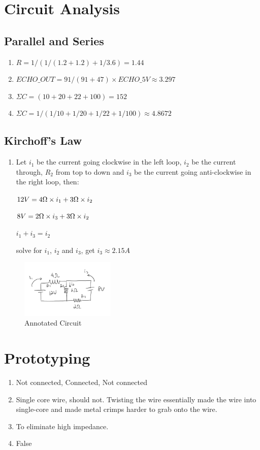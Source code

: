 \documentclass{article}
\begin{document}
\section{Circuit Analysis}
\subsection{Parallel and Series}
	\begin{enumerate}
		\item $R=1/(1/(1.2+1.2)+1/3.6)=1.44$
		\item $ECHO\_OUT=91/(91+47)\times ECHO\_5V\approx 3.297$
		\item $\Sigma C=(10+20+22+100)=152$
		\item $\Sigma C=1/(1/10+1/20+1/22+1/100)\approx 4.8672$
	\end{enumerate}
\subsection{Kirchoff's Law}
	\begin{enumerate}
		\item Let $i_1$ be the current going clockwise in the left loop, $i_2$ be the current through, $R_2$ from top to down and $i_3$ be the current going anti-clockwise in the right loop, then: \par
		$12V = 4\ohm \times i_1 + 3\ohm \times i_2$\par
		$8V = 2\ohm \times i_3 + 3\ohm \times i_2 $\par
		$i_1+i_3=i_2$\par
		solve for $i_1$, $i_2$ and $i_3$, get $i_3 \approx 2.15A$
	\end{enumerate}
	
	\begin{figure}[!h]
		\center
		\includegraphics[width=0.4\textwidth, keepaspectratio]{crappyhand}
		\caption{Annotated Circuit}
		\label{fig:kirchoff_hand}
	\end{figure}

\section{Prototyping}
\begin{enumerate}
	\item Not connected, Connected, Not connected
	\item Single core wire, should not. Twisting the wire essentially made the wire into single-core and made metal crimps harder to grab onto the wire.
	\item To eliminate high impedance.
	\item False
\end{enumerate}
\end{document}
